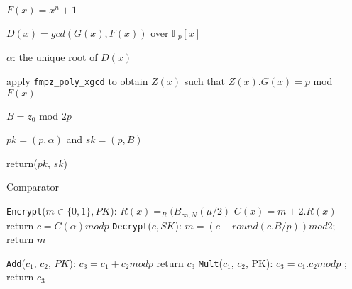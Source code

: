 \documentclass{acm_proc_article-sp}
\begin{document}
\begin{algorithm}[H]



 \SetVline







  $F(x)= x^{n}+1$
	


 	$D(x)=gcd(G(x),F(x))$ over $\mathbb{F}_p[x]$\;

	$\alpha$: the unique root of $D(x)$\;

 	apply \texttt{fmpz\_poly\_xgcd} to obtain $Z(x)$ such that $Z(x).G(x)=p$ mod $F(x)$\;

	$B=z_0$ mod $2p$\;

	$pk = (p, \alpha)$ and $sk = (p , B)$\;


return($pk$, $sk$)



 \caption{Comparator\label{Code:algo}}



\end{algorithm}
\texttt{Encrypt}($m \in \{0,1\} , PK$): 
\newline \phantom{x}\hspace{3ex}  $R(x)=_{R}(B_{\infty , N}(\mu/2)$
 \; $C(x)=m+2.R(x)$ 
\newline \phantom{x}\hspace{3ex} return  $c=C(\alpha) mod p$
\newline \texttt{Decrypt}($c, SK$):
\newline \phantom{x}\hspace{3ex} $m = (c - round(c.B/p)) mod 2$;
\phantom{x}\hspace{1ex} return $m$

\texttt{Add}($c_1$, $c_2$, $PK$):
\newline \phantom{x}\hspace{3ex} $c_3=c_1+c_2 mod p$
  \phantom{x}\hspace{1ex}  return $c_3$
\newline \texttt{Mult}($c_1$, $c_2$, PK):
 \newline \phantom{x}\hspace{3ex}  $c_3=c_1.c_2 mod p$
 ; \phantom{x}\hspace{1ex}  return $c_3$
\end{document}
